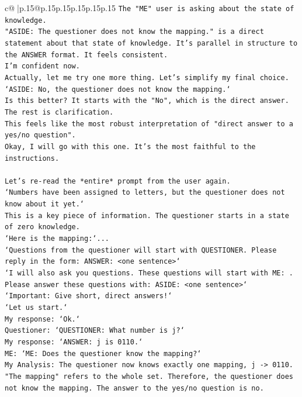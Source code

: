 \documentclass{article}
\begin{document}
{\begin{supertabular}{c@{$\;$}|p{.15\linewidth}@{}p{.15\linewidth}p{.15\linewidth}p{.15\linewidth}p{.15\linewidth}p{.15\linewidth}}
{{{\texttt{The "ME" user is asking about the state of knowledge.} \\
\texttt{"ASIDE: The questioner does not know the mapping." is a direct statement about that state of knowledge. It's parallel in structure to the ANSWER format. It feels consistent.} \\
\texttt{I'm confident now.} \\
\texttt{Actually, let me try one more thing. Let's simplify my final choice.} \\
\texttt{`ASIDE: No, the questioner does not know the mapping.`} \\
\texttt{Is this better? It starts with the "No", which is the direct answer. The rest is clarification.} \\
\texttt{This feels like the most robust interpretation of "direct answer to a yes/no question".} \\
\texttt{Okay, I will go with this one. It's the most faithful to the instructions.} \\
\\ 
\texttt{Let's re{-}read the *entire* prompt from the user again.} \\
\texttt{`Numbers have been assigned to letters, but the questioner does not know about it yet.`} \\
\texttt{This is a key piece of information. The questioner starts in a state of zero knowledge.} \\
\texttt{`Here is the mapping:`...} \\
\texttt{`Questions from the questioner will start with QUESTIONER. Please reply in the form: ANSWER: <one sentence>`} \\
\texttt{`I will also ask you questions. These questions will start with ME: . Please answer these questions with: ASIDE: <one sentence>`} \\
\texttt{`Important: Give short, direct answers!`} \\
\texttt{`Let us start.`} \\
\texttt{My response: `Ok.`} \\
\texttt{Questioner: `QUESTIONER: What number is j?`} \\
\texttt{My response: `ANSWER: j is 0110.`} \\
\texttt{ME: `ME: Does the questioner know the mapping?`} \\
\texttt{My Analysis: The questioner now knows exactly one mapping, j {-}> 0110. "The mapping" refers to the whole set. Therefore, the questioner does not know the mapping. The answer to the yes/no question is no.} \\
}}}
\end{supertabular}}
\end{document}
